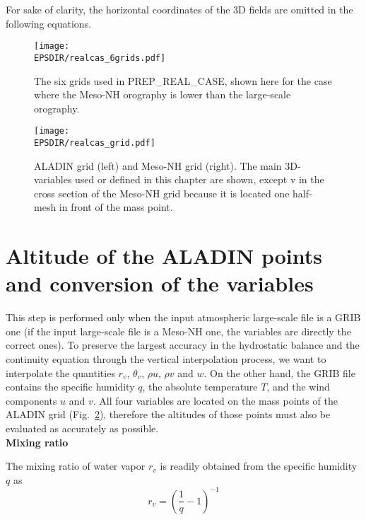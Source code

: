 For sake of clarity, the horizontal coordinates of the 3D fields are omitted
in the following equations.

\begin{figure}[!ht]
\centerline{\texttt{[image: \\EPSDIR/realcas\_6grids.pdf]}}
\caption{The six grids used in PREP\_REAL\_CASE, shown here for the case
where the Meso-NH orography is lower than the large-scale orography.
\label{fivegrids}}
\end{figure}

\clearpage

\begin{figure}[!ht]
\centerline{\texttt{[image: \\EPSDIR/realcas\_grid.pdf]}}
\caption{ALADIN grid (left) and Meso-NH grid (right).
The main 3D-variables used or defined in this chapter
are shown, except v in the cross section of the Meso-NH grid because it
is located one half-mesh in front of the mass point.
\label{grids}}
\end{figure}
\section{Altitude of the ALADIN points and conversion of the variables}

This step is performed only when the input atmospheric large-scale file
is a GRIB one (if the input large-scale file is a Meso-NH one,
the variables are directly the correct ones). To preserve the largest
accuracy in the hydrostatic balance and the continuity equation through the
vertical interpolation process, we want to interpolate the quantities
$r_v$, $\theta_v$, $\rho u$, $\rho v$ and $w$. On the other hand, the GRIB
file contains the specific humidity $q$, the absolute temperature $T$,
and the wind components $u$ and $v$. All four variables are located on
the mass points of the ALADIN grid (Fig.~\ref{grids}),
therefore the altitudes of
those points must also be evaluated as accurately as possible. \\

{\bf Mixing ratio}

The mixing ratio of water vapor $r_v$ is readily obtained from the specific
humidity $q$ as
\begin{equation}
r_v=\left(\frac{1}{q}-1\right)^{-1}
\end{equation}

